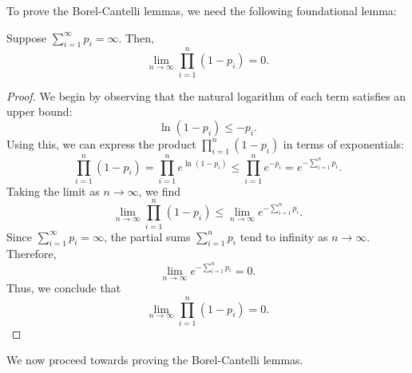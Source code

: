 To prove the Borel-Cantelli lemmas, we need the following foundational lemma:

\begin{lemma}
    Suppose \(\sum_{i=1}^{\infty} p_i = \infty\). Then, 
\[
\lim_{n \to \infty} \prod_{i=1}^{n} (1 - p_i) = 0.
\]
\end{lemma}

\begin{proof}
    We begin by observing that the natural logarithm of each term satisfies an upper bound:
\[
\ln(1 - p_i) \leq -p_i.
\]
Using this, we can express the product \(\prod_{i=1}^{n} (1 - p_i)\) in terms of exponentials:
\[
\prod_{i=1}^{n} (1 - p_i) = \prod_{i=1}^{n} e^{\ln(1 - p_i)} \leq \prod_{i=1}^{n} e^{-p_i} = e^{-\sum_{i=1}^{n} p_i}.
\]
Taking the limit as \(n \to \infty\), we find
\[
\lim_{n \to \infty} \prod_{i=1}^{n} (1 - p_i) \leq \lim_{n \to \infty} e^{-\sum_{i=1}^{n} p_i}.
\]
Since \(\sum_{i=1}^{\infty} p_i = \infty\), the partial sums \(\sum_{i=1}^{n} p_i\) tend to infinity as \(n \to \infty\). Therefore, 
\[
\lim_{n \to \infty} e^{-\sum_{i=1}^{n} p_i} = 0.
\]
Thus, we conclude that
\[
\lim_{n \to \infty} \prod_{i=1}^{n} (1 - p_i) = 0.
\]
\end{proof}

We now proceed towards proving the Borel-Cantelli lemmas.

